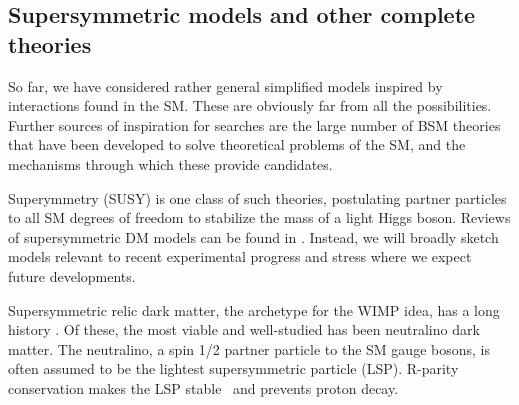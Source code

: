 

\subsection{Supersymmetric models and other complete theories}
\label{sec:SUSYModels}

So far, we have considered rather general simplified models inspired by interactions found in the SM. These are obviously far from all the possibilities. %
 Further sources of inspiration for searches are the large number of BSM theories that have been developed to solve theoretical problems of the SM, and the mechanisms through which these provide \IP candidates. 

Superymmetry (SUSY) is one class of such theories, postulating partner particles to all SM degrees of freedom to stabilize
the mass of a light Higgs boson.  
Reviews of supersymmetric DM models can be found in \cite{Feng:2010gw}. %
Instead, we will broadly sketch models relevant to
recent experimental progress and stress where we expect future developments. 

Supersymmetric relic dark matter, the archetype for the WIMP idea, has a long
history \cite{1984NuPhB.238..453E}. Of these, the most viable and well-studied has been neutralino dark matter. 
The neutralino, a spin 1/2 partner particle to the SM gauge bosons, is often assumed to be the lightest supersymmetric particle (LSP). 
R-parity conservation makes the LSP stable~\cite{Farrar:1978xj} and prevents proton decay. 

